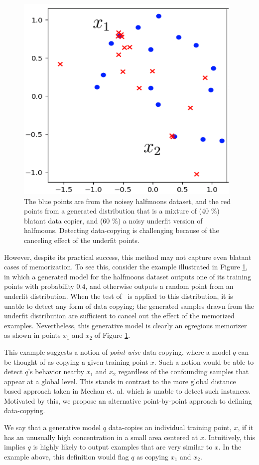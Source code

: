 \begin{figure}[ht]
\centering
	\includegraphics[width=.45\textwidth]{page_2_figure_yo.png}
	\caption{The blue points are from the noisey halfmoons dataset, and the red points from a generated distribution that is a mixture of (40 \%) blatant data copier, and (60 \%) a noisy underfit version of halfmoons. Detecting data-copying is challenging because of the canceling effect of the underfit points.}
	
	\label{fig:page_2_figure}
\end{figure}

However, despite its practical success, this method may not capture even blatant cases of memorization. To see this, consider the example illustrated in Figure \ref{fig:page_2_figure}, in which a generated model for the halfmoons dataset outputs one of its training points with probability $0.4$, and otherwise outputs a random point from an underfit distribution. When the test of~\cite{MCD2020} is applied to this distribution, it is unable to detect any form of data copying; the generated samples drawn from the underfit distribution are sufficient to cancel out the effect of the memorized examples. Nevertheless, this generative model is clearly an egregious memorizer as shown in points $x_1$ and $x_2$ of Figure \ref{fig:page_2_figure}.

This example suggests a notion of \textit{point-wise} data copying, where a model $q$ can be thought of as copying a given training point $x$. Such a notion would be able to detect $q$'s behavior nearby $x_1$ and $x_2$ regardless of the confounding samples that appear at a global level. This stands in contrast to the more global distance based approach taken in Meehan et. al. which is unable to detect such instances. Motivated by this, we propose an alternative point-by-point approach to defining data-copying.

We say that a generative model $q$  data-copies an individual training point, $x$, if it has an unusually high concentration in a small area centered at $x$. Intuitively, this implies $q$ is highly likely to output examples that are very similar to $x$. In the example above, this definition would flag $q$ as copying $x_1$ and $x_2$. 


